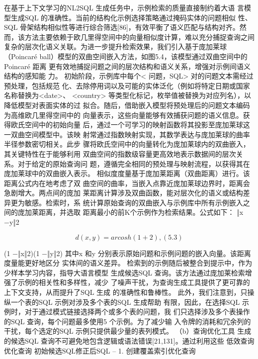 \documentclass[12pt,a4paper,openright,UTF8]{ctexbook}
\begin{document}
在基于上下文学习的NL2SQL 生成任务中，示例检索的质量直接制约着大语 言模型生成SQL 的准确性。当前的结构化示例选择策略通过掩码实体的问题相似 性、SQL 骨架结构相似性等进行综合筛选[86]，有效平衡了语义匹配与结构对齐。然 而，该方法主要依赖于欧几里得空间中的向量相似度计算，难以充分捕捉查询之间 复杂的层次化语义关联。为进一步提升检索效果，我们引入基于庞加莱球（Poincaré ball）模型的双曲空间嵌入方法，如图5.4，该模型通过双曲空间中的Poincaré 距离 更有效地捕捉问题之间的层次结构和语义关系，增强对示例间语义结构的感知能 力。 初始阶段，示例库中每个< 问题，SQL> 对的问题文本需经过预处理，包括规范 化、去除停用词以及可能的实体泛化（例如将特定日期或国家名称替换为<date>、 <country> 等类型化标记，枚举值被替换为对应列名），以降低模型对表面实体的过 拟合。随后，借助嵌入模型将预处理后的问题文本编码为高维欧几里得空间中的 向量表示，这些向量能够有效捕获问题的语义信息。获得欧氏空间中的初始向量 后，通过一个可学习的映射函数将其投影至庞加莱球这一双曲空间模型中。该映 射常通过指数映射实现，其数学表达与庞加莱球的曲率半径参数密切相关。此步 骤将欧氏空间中的向量转化为庞加莱球内的双曲嵌入，其关键特性在于能够利用 双曲空间的指数级容量更高效地表示数据间的层次关系。对于给定的原始查询问 题，遵循完全相同的预处理与映射流程，以获得其在庞加莱球中的双曲嵌入表示。 相似度度量基于庞加莱距离（双曲距离）进行。该距离公式内在地考虑了双 曲空间的曲率，当嵌入点靠近庞加莱球边界时，距离会急剧增大。两点间的庞加 莱距离计算涉及双曲函数，能对层次化的语义或结构差异更为敏感。检索时，系 统计算原始查询的双曲嵌入与示例库中所有示例嵌入之间的庞加莱距离，并选取 距离最小的前K个示例作为检索结果。公式如下： ‖x −y‖2

\begin{equation*}
d(x, y) = arcosh (1 + 2) ,(5.3)
\end{equation*}

(1 −‖x‖2)(1 −‖y‖2) 其中x 和y 分别表示原始问题和示例问题的嵌入向量。该距离度量能更好地区分 实体间的语义差异。 检索到的示例随后被整合到提示中，作为少样本学习内容，指导大语言模型 生成候选SQL 查询。该方法通过庞加莱检索增强了示例的相关性和多样性，减少 了噪声干扰，为查询生成工具提供了更可靠的上下文支持，从而提升了SQL 生成 的准确性和鲁棒性。 此外，我们注意到，只操纵一个表的SQL 示例对涉及多个表的SQL 生成帮助 有限，因此，在选择SQL 示例时，对于通过模式链接选择两个或多个表的问题，我 们只选择涉及多个表操作的SQL 查询，每个问题最多使用5 个示例。为了减少输 入令牌的消耗和冗余列的干扰，每个选定的SQL 示例只提供最少量的表列模式。 （b）查询优化工具 生成的候选SQL 查询不可避免地包含逻辑或语法错误[21,131]。通过利用这些 低效查询优化查询 初始候选SQL修正后SQL -- 1. 创建覆盖索引优化查询
\end{document}
